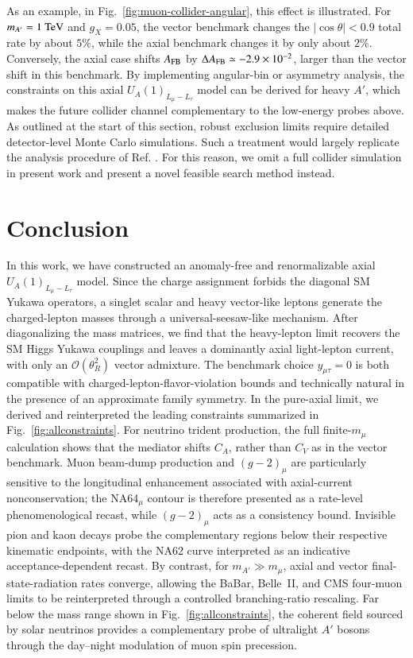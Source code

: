\documentclass[onecolumn, aps, nofootinbib, prd, preprint, floats, floatfix, amsmath, amssymb, superscriptaddress, preprintnumbers]{revtex4-2}
\begin{document}
As an example, in Fig.~\ref{fig:muon-collider-angular}, this effect is illustrated. For $m_{A'}=1~{\rm TeV}$ and $g_X=0.05$, the vector benchmark changes the $|\cos\theta|<0.9$ total rate by about $5\%$, while the axial benchmark changes it by only about $2\%$. Conversely, the axial case shifts $A_{\rm FB}$ by $\Delta A_{\rm FB}\simeq-2.9\times10^{-2}$, larger than the vector shift in this benchmark. By implementing angular-bin or asymmetry analysis, the constraints on this axial $U_A(1)_{L_\mu-L_\tau}$ model can be derived for heavy $A'$, which makes the future collider channel complementary to the low-energy probes above. As outlined at the start of this section, robust exclusion limits require detailed detector-level Monte Carlo simulations. Such a treatment would largely replicate the analysis procedure of Ref. \cite{Huang:2021nkl}. For this reason, we omit a full collider simulation in present work and present a novel feasible search method instead.


\section{Conclusion}
\label{sec:conclusion}

In this work, we have constructed an anomaly-free and renormalizable axial $U_A(1)_{L_\mu-L_\tau}$ model. Since the charge assignment forbids the diagonal SM Yukawa operators, a singlet scalar and heavy vector-like leptons generate the charged-lepton masses through a universal-seesaw-like mechanism. After diagonalizing the mass matrices, we find that the heavy-lepton limit recovers the SM Higgs Yukawa couplings and leaves a dominantly axial light-lepton current, with only an $\mathcal O(\theta_R^2)$ vector admixture. The benchmark choice $y_{\mu\tau}=0$ is both compatible with charged-lepton-flavor-violation bounds and technically natural in the presence of an approximate family symmetry.
In the pure-axial limit, we derived and reinterpreted the leading constraints summarized in Fig.~\ref{fig:allconstraints}. For neutrino trident production, the full finite-$m_\mu$ calculation shows that the mediator shifts $C_A$, rather than $C_V$ as in the vector benchmark. Muon beam-dump production and $(g-2)_\mu$ are particularly sensitive to the longitudinal enhancement associated with axial-current nonconservation; the NA64$_\mu$ contour is therefore presented as a rate-level phenomenological recast, while $(g-2)_\mu$ acts as a consistency bound. Invisible pion and kaon decays probe the complementary regions below their respective kinematic endpoints, with the NA62 curve interpreted as an indicative acceptance-dependent recast. By contrast, for $m_{A'}\gg m_\mu$, axial and vector final-state-radiation rates converge, allowing the BaBar, Belle~II, and CMS four-muon limits to be reinterpreted through a controlled branching-ratio rescaling. Far below the mass range shown in Fig.~\ref{fig:allconstraints}, the coherent field sourced by solar neutrinos provides a complementary probe of ultralight $A'$ bosons through the day--night modulation of muon spin precession.
\end{document}
